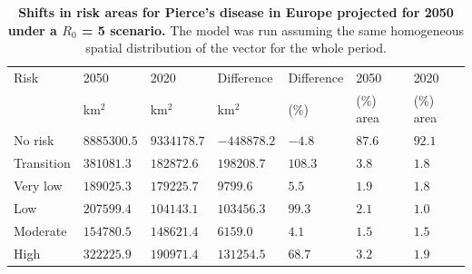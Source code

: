     \begin{table}[t!]
        \centering
        \caption{\textbf{Shifts in risk areas for Pierce's disease in Europe
                projected
                for 2050 under a $R_0$ = 5 scenario.} The model was run
            assuming the same
            homogeneous spatial distribution of the vector for the whole
            period.}
        \begin{tabular*}{\hsize}{@{\extracolsep{\fill}}lllllll}
            \hline
            Risk & 2050 & 2020 & Difference & Difference & 2050 & 2020 \\
            & km$^2$ & km$^2$ & km$^2$ & (\%) & (\%) area & (\%) area \\
            \hline
            No risk & $8885300.5$ & $9334178.7
            $ & $-448878.2
            $ & $-4.8
            $ & $87.6
            $ & $92.1
            $ \\
            Transition & $381081.3$
            & $182872.6$ & $198208.7$ & $108.3$ & $3.8$ & $1.8$ \\
            Very low & $189025.3$ & $179225.7
            $ & $9799.6$ & $5.5$ & $1.9$ & $1.8$ \\
            Low & $207599.4$ & $104143.1$ & $103456.3$ & $99.3$ & $2.1$ & $1.0$
            \\
            Moderate & $154780.5$ & $148621.4$ & $6159.0$ & $4.1$ & $1.5$ &
            $1.5$ \\
            High & $322225.9$ & $190971.4$ & $131254.5$ & $68.7$ & $3.2$ & $1.9
            $ \\
            \hline
        \end{tabular*}
        \label{table2}
    \end{table}

